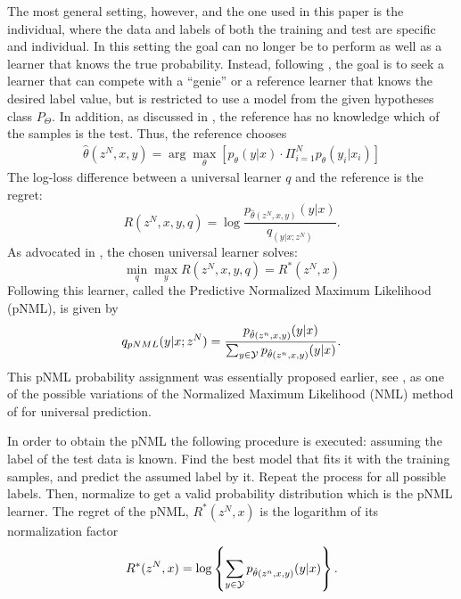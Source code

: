 \documentclass[conference,letterpaper]{IEEEtran}
\def\pNMLSingle{p_{\hat{\theta}(z^n,x,y)} (y|x)}
\begin{document}
The most general setting, however, and the one used in this paper is 
the individual, where the data and labels of both the training and test are specific and individual.
In this setting the goal can no longer be to perform as well as a learner that knows the true probability. Instead, following \cite{universal_prediction}, the goal is to seek a learner that can compete with a ``genie'' or a reference learner that knows the desired label value, but is restricted to use a model from the given hypotheses class $P_\Theta$. In addition, as discussed in \cite{FogelFeder2018}, the reference has no knowledge which of the samples is the test. Thus, the reference chooses
\begin{align} \hat{\theta}(z^N,x,y)  = \arg\max_\theta \left[ p_\theta(y|x) \cdot\Pi_{i=1}^N p_\theta(y_i|x_i) \right] \end{align}
The log-loss difference between a universal learner $q$ and the reference is the regret:
\begin{equation} \label{eq:genie_regret}
R(z^N,x,y,q) = \log \frac{p_{\hat{\theta}(z^N,x,y)}(y|x)}{q_(y|x;z^N)}.
\end{equation}
As advocated in \cite{FogelFeder2018}, the chosen universal learner solves:
\begin{equation} \label{eq:minmax_prob}
\min_q \max_y R(z^N,x,y,q) = R^*(z^N,x)
\end{equation}
Following \cite{shtar1987universal} this learner, called the Predictive Normalized Maximum Likelihood (pNML), is given by
\begin{equation} \label{eq:pNML}
q_{\mbox{\tiny{pNML}}}(y|x;z^N)=\frac{\pNMLSingle}{\sum_{y\in {\cal Y}} \pNMLSingle}.
\end{equation}
This pNML probability assignment was essentially proposed earlier, see \cite{roos2008sequentially,roos2008bayesian}, as one of the possible variations of the Normalized Maximum Likelihood (NML) method of \cite{shtar1987universal} for universal prediction.

In order to obtain the pNML the following procedure is executed: assuming the label of the test data is known. Find the best model that fits it with the training samples, and predict the assumed label by it. 
Repeat the process for all possible labels. 
Then, normalize to get a valid probability distribution which is the pNML learner.
The regret of the pNML, $R^*(z^N,x)$ is the logarithm of its normalization factor
\begin{equation} \label{eq:pNML_regret}
R^*(z^N,x) = \log \left\{ \sum_{y\in {\cal Y}} \pNMLSingle \right\}.
\end{equation}
\end{document}
